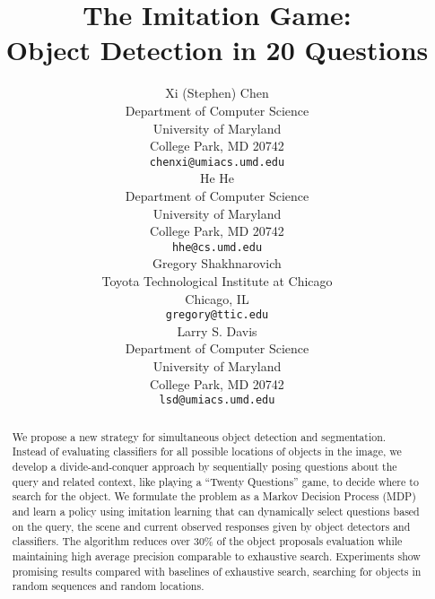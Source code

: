 \documentclass{article} %
\title{The Imitation Game:\\ Object Detection in 20 Questions}
\author{
Xi (Stephen) Chen\\
Department of Computer Science\\
University of Maryland\\
College Park, MD 20742 \\
\texttt{chenxi@umiacs.umd.edu} \\
\AND
He He \\
Department of Computer Science\\
University of Maryland\\
College Park, MD 20742 \\
\texttt{hhe@cs.umd.edu} \\
\And
Gregory Shakhnarovich\\
Toyota Technological Institute at Chicago \\
Chicago, IL\\
\texttt{gregory@ttic.edu} \\
\And
Larry S. Davis \\
Department of Computer Science\\
University of Maryland\\
College Park, MD 20742 \\
\texttt{lsd@umiacs.umd.edu} 
}
\theoremstyle{definition}
\begin{document}
\maketitle

\begin{abstract}
We propose a new strategy for simultaneous object detection and segmentation. Instead of evaluating classifiers for all possible locations of objects in the
image, we develop a divide-and-conquer approach by sequentially posing questions about the query and related context, like playing a ``Twenty Questions'' game, to decide where to search for the object. We formulate the problem as a Markov Decision Process (MDP) and learn a policy using imitation learning that can dynamically select questions based on the query, the scene and current observed responses given by object detectors and classifiers. The algorithm reduces over 30\% of the object proposals evaluation while maintaining high average precision comparable to exhaustive search. Experiments show promising results compared with baselines of exhaustive search, searching for objects in random sequences and random locations.
\end{abstract}


% 




% 






{\small


}
\end{document}
